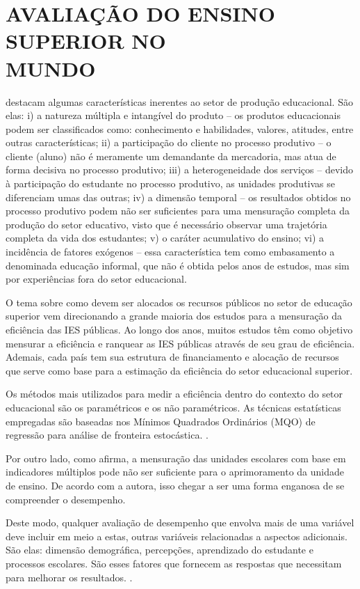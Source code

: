 
\section{AVALIAÇÃO DO ENSINO SUPERIOR NO\\MUNDO}

 destacam algumas características inerentes ao setor de produção educacional. São elas: i) a natureza múltipla e intangível do produto – os produtos educacionais podem ser classificados como: conhecimento e habilidades, valores, atitudes, entre outras características; ii) a participação do cliente no processo produtivo – o cliente (aluno) não é meramente um demandante da mercadoria, mas atua de forma decisiva no processo produtivo; iii) a heterogeneidade dos serviços – devido à participação do estudante no processo produtivo, as unidades produtivas se diferenciam umas das outras; iv) a dimensão temporal – os resultados obtidos no processo produtivo podem não ser suficientes para uma mensuração completa da produção do setor educativo, visto que é necessário observar uma trajetória completa da vida dos estudantes; v) o caráter acumulativo do ensino; vi) a incidência de fatores exógenos – essa característica tem como embasamento a denominada educação informal, que não é obtida pelos anos de estudos, mas sim por experiências fora do setor educacional. 

O tema sobre como devem ser alocados os recursos públicos no setor de educação superior vem direcionando a grande maioria dos estudos para a mensuração da eficiência das IES públicas. Ao longo dos anos, muitos estudos têm como objetivo mensurar a eficiência e ranquear as IES públicas através de seu grau de eficiência. Ademais, cada país tem sua estrutura de financiamento e alocação de recursos que serve como base para a estimação da eficiência do setor educacional superior. 

Os métodos mais utilizados para medir a eficiência dentro do contexto do setor educacional são os paramétricos e os não paramétricos. As técnicas estatísticas empregadas são baseadas nos Mínimos Quadrados Ordinários (MQO) de regressão para análise de fronteira estocástica. \cite[p.~418]{Costa_Souza_Ramos_Silva_2012}.

Por outro lado, como  afirma, a mensuração das unidades escolares com base em indicadores múltiplos pode não ser suficiente para o aprimoramento da unidade de ensino. De acordo com a autora, isso chegar a ser uma forma enganosa de se compreender o desempenho.

Deste modo, qualquer avaliação de desempenho que envolva mais de uma variável deve incluir em meio a estas, outras variáveis relacionadas a aspectos adicionais. São elas: dimensão demográfica, percepções, aprendizado do estudante e processos escolares. São esses fatores que fornecem as respostas que necessitam para melhorar os resultados. .
